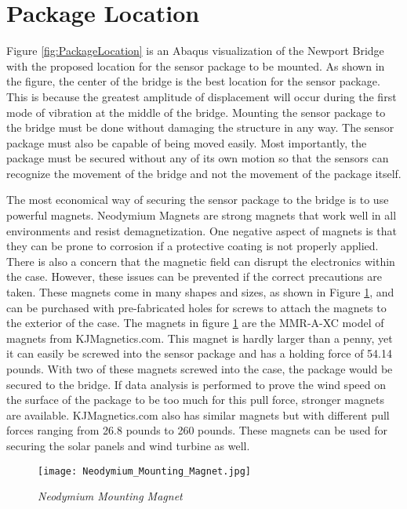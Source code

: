 \section{Package Location}

\indent Figure \ref{fig:PackageLocation} is an Abaqus visualization of the Newport Bridge with the proposed location for the sensor package to be mounted.
As shown in the figure, the center of the bridge is the best location for the sensor package. This is because the greatest amplitude of displacement will
occur during the first mode of vibration at the middle of the bridge. Mounting the sensor package to the bridge must be done without damaging the
structure in any way. The sensor package must also be capable of being moved easily. Most importantly, the package must be secured without any of its
own motion so that the sensors can recognize the movement of the bridge and not the movement of the package itself. 

The most economical way of securing the sensor package to the bridge is to use powerful magnets. Neodymium Magnets are strong magnets that work well in
all environments and resist demagnetization. One negative aspect of magnets is that they can be prone to corrosion if a protective coating is not
properly applied. There is also a concern that the magnetic field can disrupt the electronics within the case. However, these issues can be prevented if
the correct precautions are taken. These magnets come in many shapes and sizes, as shown in Figure \ref{fig:Mounting Magnet}, and can be purchased with
pre-fabricated holes for screws to attach the magnets to the exterior of the case. The magnets in figure \ref{fig:Mounting Magnet} are the MMR-A-XC
model of magnets from KJMagnetics.com. This magnet is hardly larger than a penny, yet it can easily be screwed into the sensor package and has a
holding force of 54.14 pounds. With two of these magnets screwed into the case, the package would be secured to the bridge. If data analysis is
performed to prove the wind speed on the surface of the package to be too much for this pull force, stronger magnets are available. KJMagnetics.com
also has similar magnets but with different pull forces ranging from 26.8 pounds to 260 pounds. These magnets can be used for securing the solar
panels and wind turbine as well. 

\begin{figure}[ht]
\centering
\texttt{[image: Neodymium\_Mounting\_Magnet.jpg]}
\caption{\textit{Neodymium Mounting Magnet}}
\label{fig:Mounting Magnet}
\end{figure}

